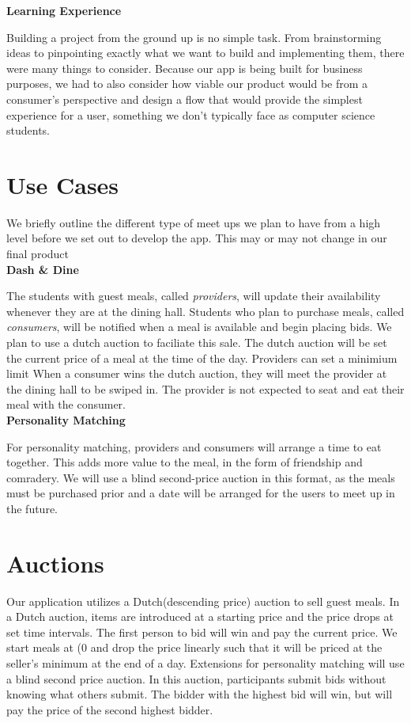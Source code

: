 \documentclass[column,12pt]{article}
\begin{document}
\textbf{Learning Experience}

Building a project from the ground up is no simple task. From brainstorming ideas to pinpointing exactly what we want to build and implementing them, there were many things to consider. Because our app is being built for business purposes, we had to also consider how viable our product would be from a consumer's perspective and design a flow that would provide the simplest experience for a user, something we don't typically face as computer science students. 


\section{Use Cases}
We briefly outline the different type of meet ups we plan to have from a high level before we set out to develop the app. This may or may not change in our final product \\

\textbf{Dash \& Dine}

The students with guest meals, called {\it providers}, will update their availability whenever they are at the dining hall. Students who plan to purchase meals, called {\it consumers}, will be notified when a meal is available and begin placing bids. We plan to use a dutch auction to faciliate this sale. The dutch auction will be set the current price of a meal at the time of the day. Providers can set a minimium limit When a consumer wins the dutch auction,
they will meet the provider at the dining hall to be swiped in. The provider is not expected to seat and eat their meal with the consumer. \\

\textbf{Personality Matching}

For personality matching, providers and consumers will arrange a time to eat together. This adds more value to the meal, in the form of friendship and comradery. We will use a blind second-price auction in this format, as the meals must be purchased prior and a date will be arranged for the users to meet up in the future. 


\section{Auctions}
Our application utilizes a Dutch(descending price) auction to sell guest meals. In a Dutch auction, items are introduced at a starting price and the price drops at set time intervals. The first person to bid will win and pay the current price. We start meals at (0 and drop the price linearly such that it will be priced at the seller’s minimum at the end of a day. Extensions for personality matching will use a blind second price auction. In this auction, participants submit bids
without knowing what others submit. The bidder with the highest bid will win, but will pay the price of the second highest bidder.
\end{document}
